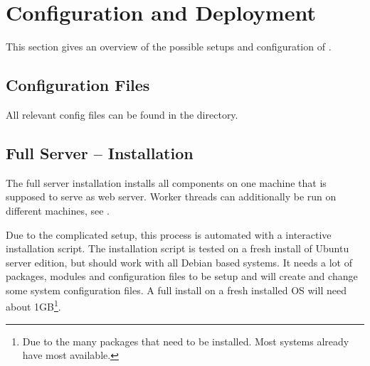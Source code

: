 \section{Configuration and Deployment}
\label{sec:deployment}

This section gives an overview of the possible setups and configuration of \spl.

\subsection{Configuration Files}

All relevant config files can be found in the  directory.

\begin{itemize}
\end{itemize}


\subsection{Full Server -- Installation}
\label{sec:serverinstall}

The full server installation installs all components on one machine that is supposed to serve as web server.
Worker threads can additionally be run on different machines, see .

Due to the complicated setup, this process is automated with a interactive installation script.
The installation script is tested on a fresh install of Ubuntu server edition, but should work with all Debian based systems.
It needs a lot of packages, modules and configuration files to be setup and will create and change some system configuration files.
A full install on a fresh installed OS will need about 1GB\footnote{Due to the many packages that need to be installed. Most systems already have most available.}.

